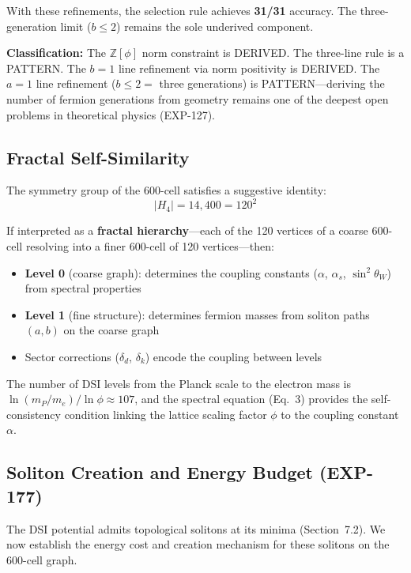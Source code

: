\documentclass[12pt,a4paper]{article}
\begin{document}
With these refinements, the selection rule achieves \textbf{31/31} accuracy. The three-generation limit ($b \leq 2$) remains the sole underived component.

\textbf{Classification:} The $\mathbb{Z}[\phi]$ norm constraint is DERIVED. The three-line rule is a PATTERN. The $b = 1$ line refinement via norm positivity is DERIVED. The $a = 1$ line refinement ($b \leq 2 =$ three generations) is PATTERN---deriving the number of fermion generations from geometry remains one of the deepest open problems in theoretical physics (EXP-127).

\subsection{Fractal Self-Similarity}

The symmetry group of the 600-cell satisfies a suggestive identity:
\begin{equation}
|H_4| = 14{,}400 = 120^2
\end{equation}

If interpreted as a \textbf{fractal hierarchy}---each of the 120 vertices of a coarse 600-cell resolving into a finer 600-cell of 120 vertices---then:
\begin{itemize}
    \item \textbf{Level 0} (coarse graph): determines the coupling constants ($\alpha$, $\alpha_s$, $\sin^2\theta_W$) from spectral properties
    \item \textbf{Level 1} (fine structure): determines fermion masses from soliton paths $(a,b)$ on the coarse graph
    \item Sector corrections ($\delta_d$, $\delta_k$) encode the coupling between levels
\end{itemize}

The number of DSI levels from the Planck scale to the electron mass is $\ln(m_P/m_e)/\ln\phi \approx 107$, and the spectral equation (Eq.~3) provides the self-consistency condition linking the lattice scaling factor $\phi$ to the coupling constant $\alpha$.

\subsection{Soliton Creation and Energy Budget (EXP-177)}
\label{sec:soliton_creation}

The DSI potential admits topological solitons at its minima (Section~7.2). We now establish the energy cost and creation mechanism for these solitons on the 600-cell graph.
\end{document}
